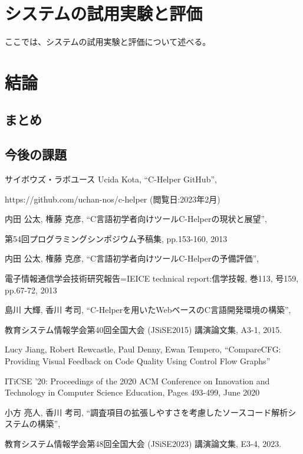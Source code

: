 \documentclass{cssspaper}
\begin{document}
    \chapter{システムの試用実験と評価}
    ここでは、システムの試用実験と評価について述べる。

    \chapter{結論}
        \section{まとめ}

        \section{今後の課題}
    

\acknowledgment  %

\begin{thebibliography}{99} %

サイボウズ・ラボユース Ucida Kota, ``C-Helper GitHub'',
    
https://github.com/uchan-nos/c-helper (閲覧日:2023年2月)
    
内田 公太, 権藤 克彦, ``C言語初学者向けツールC-Helperの現状と展望'',
    
第54回プログラミングシンポジウム予稿集, pp.153-160, 2013
    
内田 公太, 権藤 克彦, ``C言語初学者向けツールC-Helperの予備評価'',
    
電子情報通信学会技術研究報告=IEICE technical report:信学技報, 巻113, 号159, pp.67-72, 2013

島川 大輝, 香川 考司, ``C-Helperを用いたWebベースのC言語開発環境の構築'',

教育システム情報学会第40回全国大会 (JSiSE2015) 講演論文集, A3-1, 2015.

Lucy Jiang, Robert Rewcastle, Paul Denny, Ewan Tempero, 
``CompareCFG: Providing Visual Feedback on Code Quality Using Control Flow Graphs''

ITiCSE '20: Proceedings of the 2020 ACM Conference on Innovation and Technology in Computer Science Education, Pages 493-499, June 2020

小方 亮人, 香川 考司, ``調査項目の拡張しやすさを考慮したソースコード解析システムの構築'',

教育システム情報学会第48回全国大会 (JSiSE2023) 講演論文集, E3-4, 2023.


\end{thebibliography}
\end{document}
